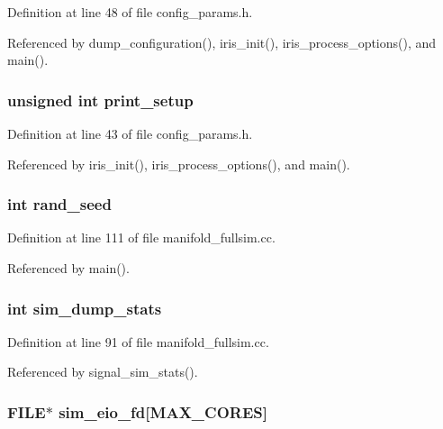 Definition at line 48 of file config\_\-params.h.

Referenced by dump\_\-configuration(), iris\_\-init(), iris\_\-process\_\-options(), and main().
\subsubsection[{print\_\-setup}]{\setlength{\rightskip}{0pt plus 5cm}unsigned int {\bf print\_\-setup}}\label{sim_8h_be380a7655f74438bdbac99614e71655}




Definition at line 43 of file config\_\-params.h.

Referenced by iris\_\-init(), iris\_\-process\_\-options(), and main().
\subsubsection[{rand\_\-seed}]{\setlength{\rightskip}{0pt plus 5cm}int {\bf rand\_\-seed}}\label{sim_8h_b58df36fd429cab6ab2f2dedd531f7a9}




Definition at line 111 of file manifold\_\-fullsim.cc.

Referenced by main().
\subsubsection[{sim\_\-dump\_\-stats}]{\setlength{\rightskip}{0pt plus 5cm}int {\bf sim\_\-dump\_\-stats}}\label{sim_8h_5f0267e6bed91a9151ebcc5e0a7557dc}




Definition at line 91 of file manifold\_\-fullsim.cc.

Referenced by signal\_\-sim\_\-stats().
\subsubsection[{sim\_\-eio\_\-fd}]{\setlength{\rightskip}{0pt plus 5cm}FILE$\ast$ {\bf sim\_\-eio\_\-fd}[MAX\_\-CORES]}\label{sim_8h_10ca7f1cb78d9d34e56b67ac6c202480}


